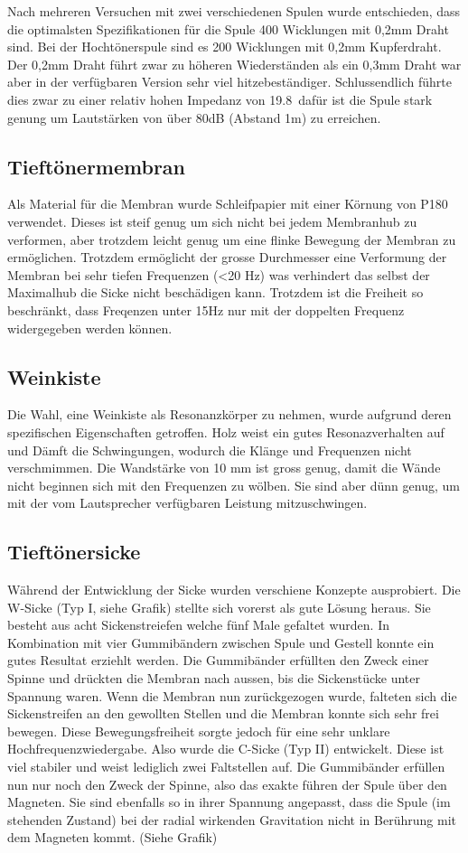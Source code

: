 \documentclass[a4paper,11pt]{report}
\begin{document}
Nach mehreren Versuchen mit zwei verschiedenen Spulen wurde entschieden, dass die optimalsten Spezifikationen für die Spule 400 Wicklungen mit 0,2mm Draht sind. Bei der Hochtönerspule sind es 200 Wicklungen mit 0,2mm Kupferdraht. Der 0,2mm Draht führt zwar zu höheren Wiederständen als ein 0,3mm Draht war aber in der verfügbaren Version sehr viel hitzebeständiger. Schlussendlich führte dies zwar zu einer relativ hohen Impedanz von 19.8\Omega\ dafür ist die Spule stark genung um Lautstärken von über 80dB (Abstand 1m) zu erreichen. 

\subsection{Tieftönermembran}
Als Material für die Membran wurde Schleifpapier mit einer Körnung von P180 verwendet. Dieses ist steif genug um sich nicht bei jedem Membranhub zu verformen, aber trotzdem leicht genug um eine flinke Bewegung der Membran zu ermöglichen. Trotzdem ermöglicht der grosse Durchmesser eine Verformung der Membran bei sehr tiefen Frequenzen (<20 Hz) was verhindert das selbst der Maximalhub die Sicke nicht beschädigen kann. Trotzdem ist die Freiheit so beschränkt, dass Freqenzen unter 15Hz nur mit der doppelten Frequenz widergegeben werden können. 

\subsection{Weinkiste}
Die Wahl, eine Weinkiste als Resonanzkörper zu nehmen, wurde aufgrund deren spezifischen Eigenschaften getroffen. Holz weist ein gutes Resonazverhalten auf und Dämft die Schwingungen, wodurch die Klänge und Frequenzen nicht verschmimmen. Die Wandstärke von 10 mm ist gross genug, damit die Wände nicht beginnen sich mit den Frequenzen zu wölben. Sie sind aber dünn genug, um mit der vom Lautsprecher verfügbaren Leistung mitzuschwingen. 

\subsection{Tieftönersicke}
Während der Entwicklung der Sicke wurden verschiene Konzepte ausprobiert. Die W-Sicke (Typ I, siehe Grafik) stellte sich vorerst als gute Lösung heraus. Sie besteht aus acht Sickenstreiefen welche fünf Male gefaltet wurden. In Kombination mit vier Gummibändern zwischen Spule und Gestell konnte ein gutes Resultat erziehlt werden. Die Gummibänder erfüllten den Zweck einer Spinne und drückten die Membran nach aussen, bis die Sickenstücke unter Spannung waren. Wenn die Membran nun zurückgezogen wurde, falteten sich die Sickenstreifen an den gewollten Stellen und die Membran konnte sich sehr frei bewegen. Diese Bewegungsfreiheit sorgte jedoch für eine sehr unklare Hochfrequenzwiedergabe. Also wurde die C-Sicke (Typ II) entwickelt. Diese ist viel stabiler und weist lediglich zwei Faltstellen auf. Die Gummibänder erfüllen nun nur noch den Zweck der Spinne, also das exakte führen der Spule über den Magneten. Sie sind ebenfalls so in ihrer Spannung angepasst, dass die Spule (im stehenden Zustand) bei der radial wirkenden Gravitation nicht in Berührung mit dem Magneten kommt. (Siehe Grafik) 
\end{document}
